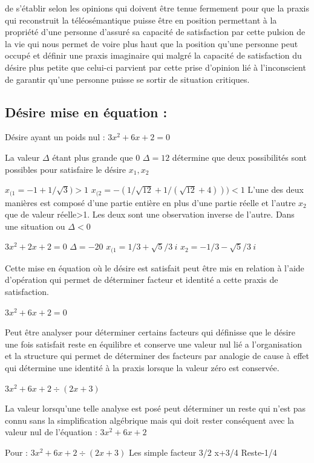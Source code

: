 \documentclass[12pt,letterpaper,oneside]{article}
\begin{document}
de s’établir selon les opinions qui doivent être tenue fermement pour que la praxis qui reconstruit la téléosémantique puisse être en position permettant à la propriété d’une personne d’assuré sa capacité de satisfaction par cette pulsion de la vie qui nous permet de voire plus haut que la position qu’une personne peut occupé et définir une praxis imaginaire qui malgré la capacité de satisfaction du désire plus petite que celui-ci parvient par cette prise d’opinion lié à l’inconscient de garantir qu’une personne puisse se sortir de situation critiques.

\subsection*{Désire mise en équation :}
Désire ayant un poids nul : $3x^2+6x+2=0$



La valeur $\Delta$ étant plus grande que 0 $\Delta=12$ détermine que deux possibilités sont possibles pour satisfaire le désire $x_1,x_2$

$x_{(1}=-1+1/\sqrt{3})>1$
$x_{(2}=- (1/\sqrt{12}+1/(\sqrt{12}+4)))<1$
L’une des deux manières est composé d’une partie entière en plus d’une partie réelle et l’autre $x_2$ que de valeur réelle>1. Les deux sont une observation inverse de l’autre.
Dans une situation ou $\Delta<0$

$3x^2+2x+2=0$
$\Delta=-20$
$x_{(1}=1/3+\sqrt{5}/3\ i$
$x_2=-1/3-\sqrt{5}/3\ i$

Cette mise en équation où le désire est satisfait peut être mis en relation à l’aide d’opération qui permet de déterminer facteur et identité a cette praxis de satisfaction.

$3x^2+6x+2=0$

Peut être analyser pour déterminer certains facteurs qui définisse que le désire une fois satisfait reste en équilibre et conserve une valeur nul lié a l’organisation et la structure qui permet de déterminer des facteurs par analogie de cause à effet qui détermine une identité à la praxis lorsque la valeur zéro est conservée.


$3x^2+6x+2\div(2x+3)$

La valeur lorsqu’une telle analyse est posé peut déterminer un reste qui n’est pas connu sans la simplification algébrique mais qui doit rester conséquent avec la valeur nul de l’équation : $3x^2+6x+2$

Pour :
$3x^2+6x+2\div(2x+3)$
Les simple facteur 3/2 x+3/4  Reste-1/4
\end{document}
